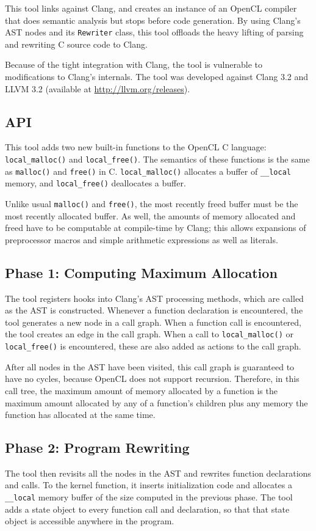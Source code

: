 \documentclass{article}
\begin{document}
This tool links against Clang, and creates an instance of an OpenCL compiler that does semantic analysis but stops before code generation. By using Clang's AST nodes and its \texttt{Rewriter} class, this tool offloads the heavy lifting of parsing and rewriting C source code to Clang.

Because of the tight integration with Clang, the tool is vulnerable to modifications to Clang's internals. The tool was developed against Clang 3.2 and LLVM 3.2 (available at \url{http://llvm.org/releases}).

\subsection{API}
This tool adds two new built-in functions to the OpenCL C language: \texttt{local\_malloc()} and \texttt{local\_free()}. The semantics of these functions is the same as \texttt{malloc()} and \texttt{free()} in C. \texttt{local\_malloc()} allocates a buffer of \texttt{\_\_local} memory, and \texttt{local\_free()} deallocates a buffer.

Unlike usual \texttt{malloc()} and \texttt{free()}, the most recently freed buffer must be the most recently allocated buffer. As well, the amounts of memory allocated and freed have to be computable at compile-time by Clang; this allows expansions of preprocessor macros and simple arithmetic expressions as well as literals.

\subsection{Phase 1: Computing Maximum Allocation}
The tool registers hooks into Clang's AST processing methods, which are called as the AST is constructed. Whenever a function declaration is encountered, the tool generates a new node in a call graph. When a function call is encountered, the tool creates an edge in the call graph. When a call to \texttt{local\_malloc()} or \texttt{local\_free()} is encountered, these are also added as actions to the call graph.

After all nodes in the AST have been visited, this call graph is guaranteed to have no cycles, because OpenCL does not support recursion. Therefore, in this call tree, the maximum amount of memory allocated by a function is the maximum amount allocated by any of a function's children plus any memory the function has allocated at the same time.

\subsection{Phase 2: Program Rewriting}
The tool then revisits all the nodes in the AST and rewrites function declarations and calls. To the kernel function, it inserts initialization code and allocates a \texttt{\_\_local} memory buffer of the size computed in the previous phase. The tool adds a state object to every function call and declaration, so that that state object is accessible anywhere in the program.
\end{document}

